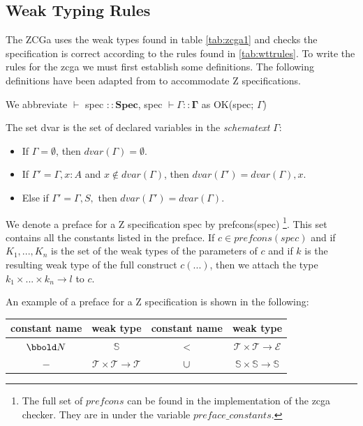 \subsection{Weak Typing Rules}

The ZCGa uses the weak types found in table \ref{tab:zcga1} and checks the
specification is correct according to the rules found in \ref{tab:wttrules}. To
write the rules for the \gls{zcga} we must first establish some definitions. The
following definitions have been adapted from \cite{wtt} to accommodate Z
specifications.

\begin{defin}
We abbreviate $\vdash$ spec $\mathbf{::Spec}$, spec $\vdash \Gamma
\mathbf{::\Gamma}$ as OK(spec; $\Gamma$)
\end{defin}

\begin{defin} The set dvar is the set of declared variables in the
\emph{schematext} $\Gamma$:
\begin{itemize}
\item If $\Gamma = \emptyset$, then $dvar(\Gamma) = \emptyset$.
\item If $\Gamma' = \Gamma, x:A$ and $x \notin dvar(\Gamma)$, then
$dvar(\Gamma') = dvar(\Gamma), x$.
\item Else if $\Gamma' =\Gamma,S,$ then $dvar(\Gamma') = dvar(\Gamma)$.
\end{itemize}
\end{defin}

\begin{defin} We denote a preface for a Z specification spec by prefcons(spec)
\footnote{The full set of $prefcons$ can be found in the implementation of the
\gls{zcga} checker. They are in under the variable $preface\_constants$.}. This
set contains all the constants listed in the preface. If $c \in prefcons(spec)$
and if $K_{1},...,K_{n}$ is the set of the weak types of the parameters of $c$
and if $k$ is the resulting weak type of the full construct $c(...)$, then we
attach the type $k_{1} \times ... \times k_{n} \rightarrow l$ to $c$.
\end{defin}

\begin{exam}

\end{exam} An example of a preface for a Z specification is shown in the
following:

\begin{tabular}{| c | c || c | c |}
\hline
constant name & weak type & constant name & weak type \\
\hline
$\nat$ & $\mathbb{S}$ & $<$ & $\mathcal{T} \times \mathcal{T} \rightarrow
\mathcal{E}$ \\
$-$ & $\mathcal{T} \times \mathcal{T} \rightarrow \mathcal{T}$ & $\cup$ &
$\mathbb{S} \times \mathbb{S} \rightarrow \mathbb{S} $ \\
\hline
\end{tabular}

